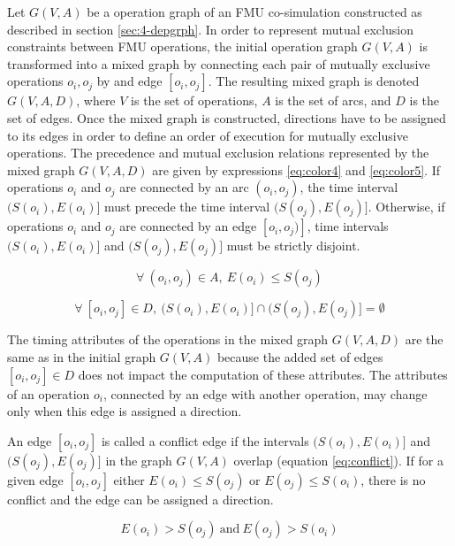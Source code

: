 Let $G(V,A)$ be a operation graph of an FMU co-simulation constructed as described in section \ref{sec:4-depgrph}. In order to represent mutual exclusion constraints between FMU operations, the initial operation graph $G(V,A)$ is transformed into a mixed graph by connecting each pair of mutually exclusive operations $o_i, o_j$ by and edge $[o_i, o_j]$. The resulting mixed graph is denoted $G(V,A,D)$, where $V$ is the set of operations, $A$ is the set of arcs, and $D$ is the set of edges. Once the mixed graph is constructed, directions have to be assigned to its edges in order to define an order of execution for mutually exclusive operations. The precedence and mutual exclusion relations represented by the mixed graph $G(V,A,D)$ are given by expressions \ref{eq:color4} and \ref{eq:color5}. If operations $o_i$ and $o_j$ are connected by an arc $(o_i,o_j)$, the time interval $(S(o_i), E(o_i)]$ must precede the time interval $(S(o_j), E(o_j)]$. Otherwise, if operations $o_i$ and $o_j$ are connected by an edge $[o_i,o_j)]$, time intervals $(S(o_i), E(o_i)]$ and $(S(o_j), E(o_j)]$ must be strictly disjoint.

\begin{equation}
\forall\ (o_i,o_j) \in A,\ E(o_i) \leq S(o_j)
\label{eq:color4}
\end{equation}

\begin{equation}
\forall\ [o_i,o_j] \in D,\  (S(o_i), E(o_i)] \cap (S(o_j), E(o_j)] = \emptyset
\label{eq:color5}
\end{equation}

The timing attributes of the operations in the mixed graph $G(V,A,D)$ are the same as in the initial graph $G(V,A)$ because the added set of edges $[o_i, o_j] \in D$ does not impact the computation of these attributes. The attributes of an operation $o_i$, connected by an edge with another operation, may change only when this edge is assigned a direction. 

An edge $[o_i,o_j]$ is called a conflict edge if the intervals $(S(o_i), E(o_i)]$ and $(S(o_j), E(o_j)]$ in the graph $G(V,A)$ overlap (equation \ref{eq:conflict}). If for a given edge $[o_i,o_j]$ either $E(o_i) \leq S(o_j)$ or $E(o_j) \leq S(o_i)$, there is no conflict and the edge can be assigned a direction. 

\begin{equation}
E(o_i) > S(o_j)\ \text{and}\ E(o_j) > S(o_i)
\label{eq:conflict}
\end{equation}

